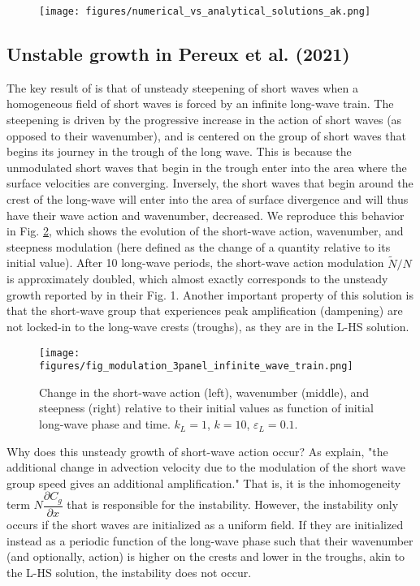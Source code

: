\documentclass[draft]{agujournal2019}
\begin{document}
\begin{figure}[h]
\label{fig:numerical_vs_analytical_ak}
\centering
\texttt{[image: figures/numerical\_vs\_analytical\_solutions\_ak.png]}
\caption{}
\end{figure}

\subsection{Unstable growth in Pereux et al. (2021)}
\label{subsection:unstable_growth}

The key result of  is that of unsteady steepening of
short waves when a homogeneous field of short waves is forced by an infinite
long-wave train.
The steepening is driven by the progressive increase in the action of short
waves (as opposed to their wavenumber), and is centered on the group of short
waves that begins its journey in the trough of the long wave.
This is because the unmodulated short waves that begin in the trough enter into
the area where the surface velocities are converging.
Inversely, the short waves that begin around the crest of the long-wave will
enter into the area of surface divergence and will thus have their wave action
and wavenumber, decreased.
We reproduce this behavior in Fig. \ref{fig:modulation_3panel_infinite}, which
shows the evolution of the short-wave action, wavenumber, and steepness
modulation (here defined as the change of a quantity relative to its initial value).
After 10 long-wave periods, the short-wave action modulation $\widetilde{N}/N$
is approximately doubled, which almost exactly corresponds to the unsteady growth
reported by  in their Fig. 1.
Another important property of this solution is that the short-wave group that
experiences peak amplification (dampening) are not locked-in to the long-wave
crests (troughs), as they are in the L-HS solution.

\begin{figure}[h]
\label{fig:modulation_3panel_infinite}
\centering
\texttt{[image: figures/fig\_modulation\_3panel\_infinite\_wave\_train.png]}
\caption{
  Change in the short-wave action (left), wavenumber (middle), and steepness (right)
  relative to their initial values as function of initial long-wave phase and time.
  $k_L = 1$, $k = 10$, $\varepsilon_L = 0.1$.
}
\end{figure}

Why does this unsteady growth of short-wave action occur?
As  explain, "the additional change in advection
velocity due to the modulation of the short wave group speed gives an additional
amplification."
That is, it is the inhomogeneity term $N \dfrac{\partial C_g}{\partial x}$ that
is responsible for the instability.
However, the instability only occurs if the short waves are initialized as a
uniform field.
If they are initialized instead as a periodic function of the long-wave phase
such that their wavenumber (and optionally, action) is higher on the crests
and lower in the troughs, akin to the L-HS solution, the instability does not
occur.
\end{document}
